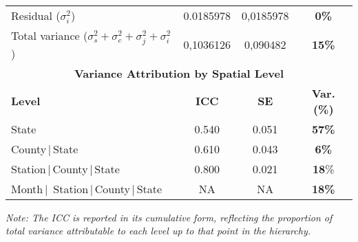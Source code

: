 \begin{table}[H]
\begin{tabular}{lccc}
Residual ($\sigma_{i}^2$)   & 0.0185978 & 0,0185978   & \textbf{0\%} \\
Total variance ($\sigma_s^2+\sigma_c^2+\sigma_j^2+\sigma_{i}^2$) & 0,1036126 & 0,090482&\textbf{15\%} \\
\hline
\hline
\multicolumn{4}{c}{\textbf{Variance Attribution by Spatial Level}} \\
\hline
\textbf{Level} & \textbf{ICC} & \textbf{SE} & \textbf{Var. (\%)} \\
\hline
State                     & 0.540 & 0.051 & \textbf{57\%} \\
County\,|\,State          & 0.610 & 0.043 & \textbf{6\%} \\
Station\,|\,County\,|\,State & 0.800 & 0.021 & \textbf{18}\% \\
Month\,|\, Station\,|\,County\,|\,State & NA & NA  & \textbf{18\%} \\
\hline
\hline
\end{tabular}

\vspace{1em}
\raggedright
\scriptsize
\textit{Note: The ICC is reported in its cumulative form, reflecting the proportion of total variance attributable to each level up to that point in the hierarchy.}
\end{table}
